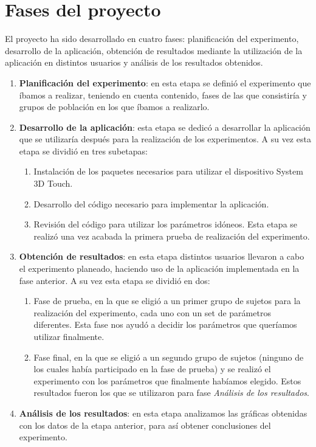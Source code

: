 \documentclass[a4paper,11pt, oneside]{book}
\begin{document}
\section{Fases del proyecto} \label{seccion:fases}
El proyecto ha sido desarrollado en cuatro fases: planificación del experimento, desarrollo de la aplicación, obtención de resultados mediante la utilización de la aplicación en distintos usuarios y análisis de los resultados obtenidos. 
\begin{enumerate}
	\item \textbf{Planificación del experimento}: en esta etapa se definió el experimento que íbamos a realizar, teniendo en cuenta contenido, fases de las que consistiría y grupos de población en los que íbamos a realizarlo.
	\item \textbf{Desarrollo de la aplicación}: esta etapa se dedicó a desarrollar la aplicación que se utilizaría después para la realización de los experimentos. A su vez esta etapa se dividió en tres subetapas:
	\begin{enumerate}
		\item Instalación de los paquetes necesarios para utilizar el dispositivo System 3D Touch.
		\item Desarrollo del código necesario para implementar la aplicación.
		\item Revisión del código para utilizar los parámetros idóneos. Esta etapa se realizó una vez acabada la primera prueba de realización del experimento.
	\end{enumerate}
	\item \textbf{Obtención de resultados}: en esta etapa distintos usuarios llevaron a cabo el experimento planeado, haciendo uso de la aplicación implementada en la fase anterior.
	A su vez esta etapa se dividió en dos:
	\begin{enumerate}
		\item Fase de prueba, en la que se eligió a un primer grupo de sujetos para la realización del experimento, cada uno con un set de parámetros diferentes. Esta fase nos ayudó a decidir los parámetros que queríamos utilizar finalmente.
		\item Fase final, en la que se eligió a un segundo grupo de sujetos (ninguno de los cuales había participado en la fase de prueba) y se realizó el experimento con los parámetros que finalmente habíamos elegido.
		Estos resultados fueron los que se utilizaron para fase \textit{Análisis de los resultados}.
	\end{enumerate}
		
	\item \textbf{Análisis de los resultados}: en esta etapa analizamos las gráficas obtenidas con los datos de la etapa anterior, para así obtener conclusiones del experimento.
\end{enumerate}
\end{document}
